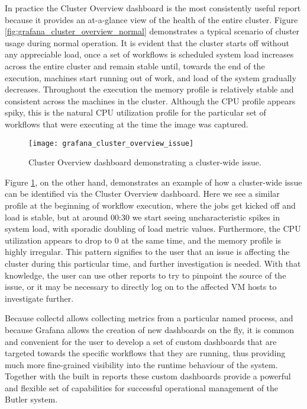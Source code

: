 In practice the Cluster Overview dashboard is the most consistently useful report because it provides an at-a-glance view of the health of the entire cluster. Figure \ref{fig:grafana_cluster_overview_normal} demonstrates a typical scenario of cluster usage during normal operation. It is evident that the cluster starts off without any appreciable load, once a set of workflows is scheduled system load increases across the entire cluster and remain stable until, towards the end of the execution, machines start running out of work, and load of the system gradually decreases. Throughout the execution the memory profile is relatively stable and consistent across the machines in the cluster. Although the CPU profile appears spiky, this is the natural CPU utilization profile for the particular set of workflows that were executing at the time the image was captured.

\begin{figure}[h]
\texttt{[image: grafana\_cluster\_overview\_issue]}
\centering
\caption {Cluster Overview dashboard demonstrating a cluster-wide issue.}
\label{fig:grafana_cluster_overview_issue}
\end{figure} 

Figure \ref{fig:grafana_cluster_overview_issue}, on the other hand, demonstrates an example of how a cluster-wide issue can be identified via the Cluster Overview dashboard. Here we see a similar profile at the beginning of workflow execution, where the jobs get kicked off and load is stable, but at around 00:30 we start seeing uncharacteristic spikes in system load, with sporadic doubling of load metric values. Furthermore, the CPU utilization appears to drop to 0 at the same time, and the memory profile is highly irregular. This pattern signifies to the user that an issue is affecting the cluster during this particular time, and further investigation is needed. With that knowledge, the user can use other reports to try to pinpoint the source of the issue, or it may be necessary to directly log on to the affected VM hosts to investigate further.

Because collectd allows collecting metrics from a particular named process, and because Grafana allows the creation of new dashboards on the fly, it is common and convenient for the user to develop a set of custom dashboards that are targeted towards the specific workflows that they are running, thus providing much more fine-grained visibility into the runtime behaviour of the system. Together with the built in reports these custom dashboards provide a powerful and flexible set of capabilities for successful operational management of the Butler system. 

